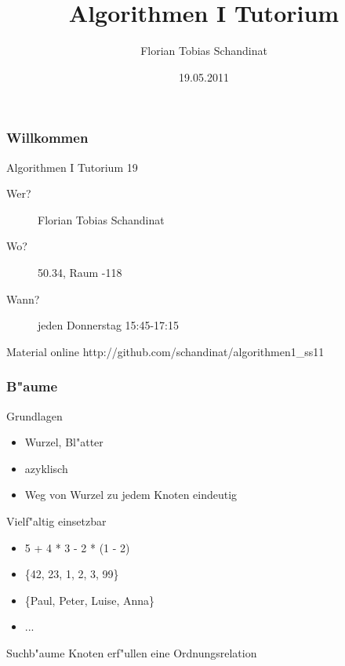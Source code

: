 \documentclass{beamer}
\title{Algorithmen I Tutorium}
\author{Florian Tobias Schandinat}
\date{19.05.2011}
\institute{FTS}
\begin{document}
\begin{frame}
\frametitle{Willkommen}
\begin{block}{Algorithmen I Tutorium 19}
\begin{description}
\item[Wer?] Florian Tobias Schandinat\\
\item[Wo?] 50.34, Raum -118\\
\item[Wann?] jeden Donnerstag 15:45-17:15
\end{description}
\end{block}

\begin{block}{Material online}
http://github.com/schandinat/algorithmen1\_ss11
\end{block}
\end{frame}

\begin{frame}
\frametitle{B"aume}
\begin{block}{Grundlagen}
\begin{itemize}
\item Wurzel, Bl"atter
\item azyklisch
\item Weg von Wurzel zu jedem Knoten eindeutig
\end{itemize}
\end{block}

\pause

\begin{exampleblock}{Vielf"altig einsetzbar}
\begin{itemize}
\item 5 + 4 * 3 - 2 * (1 - 2)\pause
\item \{42, 23, 1, 2, 3, 99\}\pause
\item \{Paul, Peter, Luise, Anna\}\pause
\item ...
\end{itemize}
\end{exampleblock}

\pause

\begin{block}{Suchb"aume}
Knoten erf"ullen eine Ordnungsrelation
\end{block}
\end{frame}
\end{document}
